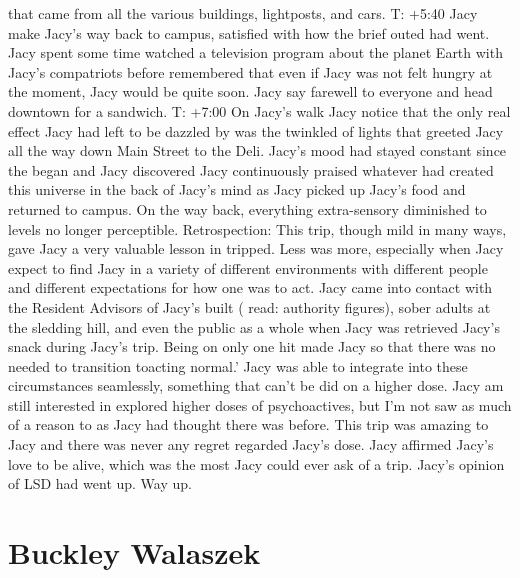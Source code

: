 \documentclass[12pt]{book}
\begin{document}
that came from all the various buildings, lightposts, and cars. T: +5:40 Jacy make Jacy's way back to campus, satisfied with how the brief outed had went. Jacy spent some time watched a television program about the planet Earth with Jacy's compatriots before remembered that even if Jacy was not felt hungry at the moment, Jacy would be quite soon. Jacy say farewell to everyone and head downtown for a sandwich. T: +7:00 On Jacy's walk Jacy notice that the only real effect Jacy had left to be dazzled by was the twinkled of lights that greeted Jacy all the way down Main Street to the Deli. Jacy's mood had stayed constant since the began and Jacy discovered Jacy continuously praised whatever had created this universe in the back of Jacy's mind as Jacy picked up Jacy's food and returned to campus. On the way back, everything extra-sensory diminished to levels no longer perceptible. Retrospection: This trip, though mild in many ways, gave Jacy a very valuable lesson in tripped. Less was more, especially when Jacy expect to find Jacy in a variety of different environments with different people and different expectations for how one was to act. Jacy came into contact with the Resident Advisors of Jacy's built ( read: authority figures), sober adults at the sledding hill, and even the public as a whole when Jacy was retrieved Jacy's snack during Jacy's trip. Being on only one hit made Jacy so that there was no needed to transition toacting normal.' Jacy was able to integrate into these circumstances seamlessly, something that can't be did on a higher dose. Jacy am still interested in explored higher doses of psychoactives, but I'm not saw as much of a reason to as Jacy had thought there was before. This trip was amazing to Jacy and there was never any regret regarded Jacy's dose. Jacy affirmed Jacy's love to be alive, which was the most Jacy could ever ask of a trip. Jacy's opinion of LSD had went up. Way up.



\chapter{Buckley Walaszek}
\end{document}
